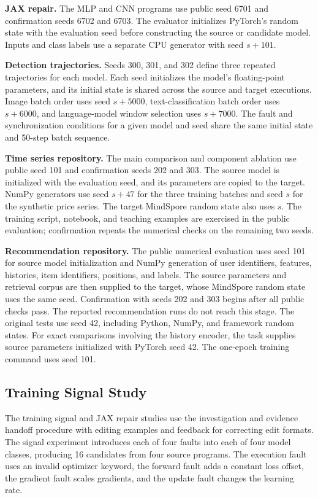 \textbf{JAX repair.} The MLP and CNN programs use public seed 6701 and confirmation seeds 6702 and 6703. The evaluator initializes PyTorch's random state with the evaluation seed before constructing the source or candidate model. Inputs and class labels use a separate CPU generator with seed $s+101$.

\textbf{Detection trajectories.} Seeds 300, 301, and 302 define three repeated trajectories for each model. Each seed initializes the model's floating-point parameters, and its initial state is shared across the source and target executions. Image batch order uses seed $s+5000$, text-classification batch order uses $s+6000$, and language-model window selection uses $s+7000$. The fault and synchronization conditions for a given model and seed share the same initial state and 50-step batch sequence.

\textbf{Time series repository.} The main comparison and component ablation use public seed 101 and confirmation seeds 202 and 303. The source model is initialized with the evaluation seed, and its parameters are copied to the target. NumPy generators use seed $s+47$ for the three training batches and seed $s$ for the synthetic price series. The target MindSpore random state also uses $s$. The training script, notebook, and teaching examples are exercised in the public evaluation; confirmation repeats the numerical checks on the remaining two seeds.

\textbf{Recommendation repository.} The public numerical evaluation uses seed 101 for source model initialization and NumPy generation of user identifiers, features, histories, item identifiers, positions, and labels. The source parameters and retrieval corpus are then supplied to the target, whose MindSpore random state uses the same seed. Confirmation with seeds 202 and 303 begins after all public checks pass. The reported recommendation runs do not reach this stage. The original tests use seed 42, including Python, NumPy, and framework random states. For exact comparisons involving the history encoder, the task supplies source parameters initialized with PyTorch seed 42. The one-epoch training command uses seed 101.

\subsection{Training Signal Study}
The training signal and JAX repair studies use the investigation and evidence handoff procedure with editing examples and feedback for correcting edit formats. The signal experiment introduces each of four faults into each of four model classes, producing 16 candidates from four source programs. The execution fault uses an invalid optimizer keyword, the forward fault adds a constant loss offset, the gradient fault scales gradients, and the update fault changes the learning rate.

